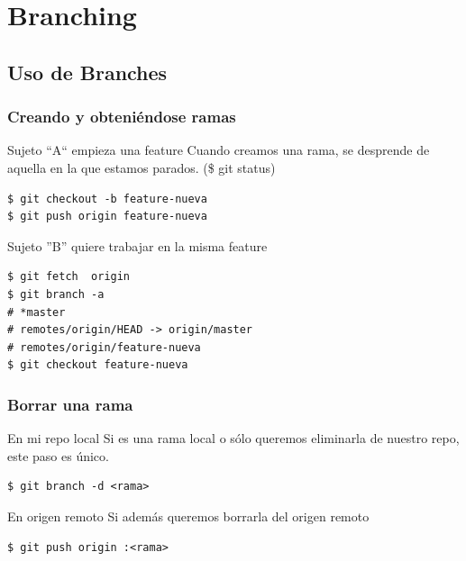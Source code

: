 \documentclass{beamer}
\begin{document}
\section{Branching}

\subsection{Uso de Branches}

\begin{frame}[fragile]\frametitle{Creando y obteniéndose ramas}

    \begin{block}{Sujeto ``A`` empieza una feature}
      Cuando creamos una rama, se desprende de aquella en la que estamos parados. (\$ git status)
      \begin{verbatim}
$ git checkout -b feature-nueva
$ git push origin feature-nueva
      \end{verbatim}
    \end{block} \pause
    
    \begin{block}{Sujeto ''B'' quiere trabajar en la misma feature}
      \begin{verbatim}
$ git fetch  origin
$ git branch -a
# *master
# remotes/origin/HEAD -> origin/master
# remotes/origin/feature-nueva
$ git checkout feature-nueva
      \end{verbatim}
    \end{block}
  
\end{frame}

\begin{frame}[fragile]\frametitle{Borrar una rama}

    \begin{block}{En mi repo local}
      Si es una rama local o sólo queremos eliminarla de nuestro repo, este paso es único.
      \begin{verbatim}
$ git branch -d <rama>
      \end{verbatim}
    \end{block} \pause
    
    \begin{block}{En origen remoto}
      Si además queremos borrarla del origen remoto
      \begin{verbatim}
$ git push origin :<rama>
      \end{verbatim}
    \end{block}
  
\end{frame}
\end{document}

